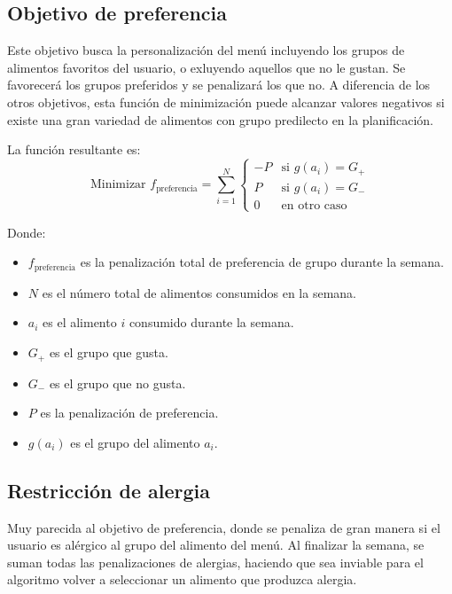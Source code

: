 \subsection{Objetivo de preferencia}

Este objetivo busca la personalización del menú incluyendo los grupos de alimentos favoritos del usuario, o exluyendo aquellos que no le gustan. Se favorecerá los grupos preferidos y se penalizará los que no. A diferencia de los otros objetivos, esta función de minimización puede alcanzar valores negativos si existe una gran variedad de alimentos con grupo predilecto en la planificación.

La función resultante es:
\[
\text{Minimizar } f_{\text{preferencia}} = \sum_{i=1}^{N}
\begin{cases} 
-P & \text{si } g(a_i) = G_+ \\
P & \text{si } g(a_i) = G_- \\
0 & \text{en otro caso}
\end{cases}
\]
\begin{small}
    Donde:
    \begin{itemize}
    \item \( f_{\text{preferencia}} \) es la penalización total de preferencia de grupo durante la semana.
    \item \( N \) es el número total de alimentos consumidos en la semana.
    \item \( a_i \) es el alimento \( i \) consumido durante la semana.
    \item \( G_+ \) es el grupo que gusta.
    \item \( G_- \) es el grupo que no gusta.
    \item \( P \) es la penalización de preferencia.
    \item \( g(a_i) \) es el grupo del alimento \( a_i \).
    \end{itemize}
\end{small}

\subsection{Restricción de alergia}

Muy parecida al objetivo de preferencia, donde se penaliza de gran manera si el usuario es alérgico al grupo del alimento del menú. Al finalizar la semana, se suman todas las penalizaciones de alergias, haciendo que sea inviable para el algoritmo volver a seleccionar un alimento que produzca alergia.

